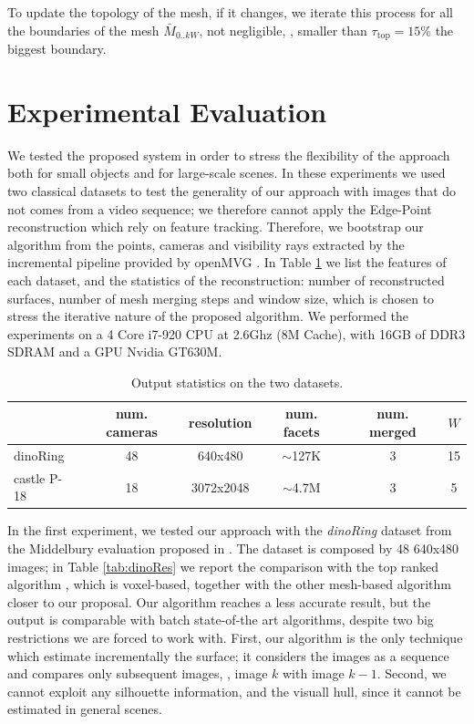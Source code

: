 To update the topology of the mesh, if it changes, we iterate this process for all the boundaries of the mesh  $\mathit{\bar{M}}_{0..kW}$, not negligible, \ie, smaller than $\tau_{\text{top}}= 15\%$ the biggest boundary.



\section{Experimental Evaluation}
\label{sec:exp}
We tested the proposed system in order to stress the flexibility of the approach both for small objects and for large-scale scenes.
In these experiments we used two classical \mvs datasets to test the generality of our approach with  images that do not comes from a video  sequence; we therefore cannot apply the Edge-Point reconstruction which rely on feature tracking. 
Therefore, we bootstrap our algorithm from the points, cameras and visibility rays extracted by the incremental pipeline provided by openMVG \cite{openMVG}. 
In Table \ref{fig:expData} we list the features of each dataset, and the statistics of the reconstruction: number of reconstructed surfaces, number of mesh merging steps and window size, which is chosen to stress the iterative nature of the proposed algorithm.
We performed the experiments on a 4 Core i7-920 CPU at 2.6Ghz (8M Cache), with 16GB of DDR3 SDRAM and a GPU Nvidia GT630M.


\begin{table}[t]
\normalsize
\centering
\setlength{\tabcolsep}{1px}
  \caption{Output statistics on the two datasets.}
  \label{fig:expData}
\begin{tabular}{lccccc}
&num. cameras& resolution&num. facets& num. merged &$W$ \\
\hline
dinoRing&48&640x480&$\sim$127K&3&15\\
castle P-18&18&3072x2048&$\sim$4.7M&3&5\\
\end{tabular}
\end{table}

In the first experiment, we tested our approach with the \emph{dinoRing} dataset  from the Middelbury evaluation proposed in \cite{seitz2006comparison}. 
The dataset is composed by 48 640x480 images; in Table \ref{tab:dinoRes} we report the comparison with the top ranked algorithm \cite{savinov2016semantic}, which is voxel-based, together with the other mesh-based algorithm closer to our proposal.
Our algorithm reaches a less accurate result, but  the output is comparable with batch state-of-the art algorithms, despite two big restrictions we are forced to work with.
First, our algorithm is the only technique  which estimate incrementally the surface; it considers the images as a sequence and compares only subsequent images, \ie, image $k$ with image $k-1$.
Second, we cannot exploit any silhouette information, and the visuall hull, since it cannot be estimated in general scenes.

